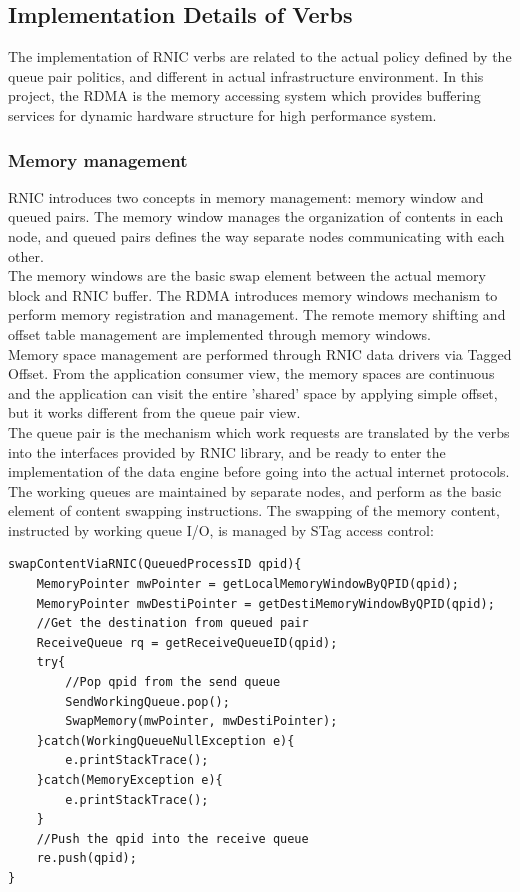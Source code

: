 \documentclass[11pt,openright,a4paper]{report}
\begin{document}
\subsection{Implementation Details of Verbs}
The implementation of RNIC verbs are related to the actual policy defined by the queue pair politics, and different in actual infrastructure environment. In this project, the RDMA is the memory accessing system which provides buffering services for dynamic hardware structure for high performance system. \\
\subsubsection{Memory management}
RNIC introduces two concepts in memory management: memory window and queued pairs. The memory window manages the organization of contents in each node, and queued pairs defines the way separate nodes communicating with each other.\\
The memory windows are the basic swap element between the actual memory block and RNIC buffer\cite{garcia2006binding}. The RDMA introduces memory windows mechanism to perform memory registration and management. The remote memory shifting and offset table management are implemented through memory windows. \\
Memory space management are performed through RNIC data drivers via Tagged Offset\cite{boyd2007memory}. From the application consumer view, the memory spaces are continuous and the application can visit the entire 'shared' space by applying simple offset, but it works different from the queue pair view.\\
The queue pair is the mechanism which work requests are translated by the verbs into the interfaces provided by RNIC library, and be ready to enter the implementation of the data engine before going into the actual internet protocols. The working queues are maintained by separate nodes, and perform as the basic element of content swapping instructions. The swapping of the memory content, instructed by working queue I/O, is managed by STag access control:
\begin{lstlisting}[breaklines,breakatwhitespace,caption={STag access control},label=stag-psudoCode]
swapContentViaRNIC(QueuedProcessID qpid){
	MemoryPointer mwPointer = getLocalMemoryWindowByQPID(qpid);
	MemoryPointer mwDestiPointer = getDestiMemoryWindowByQPID(qpid);
	//Get the destination from queued pair
	ReceiveQueue rq = getReceiveQueueID(qpid);	 
	try{
		//Pop qpid from the send queue
		SendWorkingQueue.pop();				
		SwapMemory(mwPointer, mwDestiPointer);
	}catch(WorkingQueueNullException e){
		e.printStackTrace();
	}catch(MemoryException e){
		e.printStackTrace();
	}
	//Push the qpid into the receive queue
	re.push(qpid);								
}
\end{lstlisting}
\end{document}
